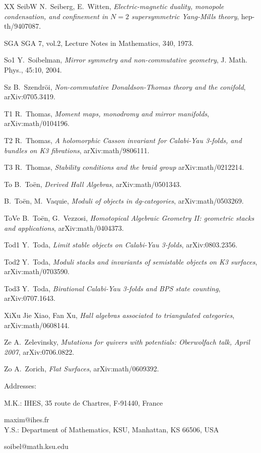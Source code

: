 \documentclass[12pt]{article}
\begin{document}
\begin{thebibliography}{XX}
\bibitem
 {SeibW} N.~Seiberg, E.~Witten, {\it Electric-magnetic duality, monopole condensation, and confinement in $N=2$ supersymmetric Yang-Mills theory}, hep-th/9407087.




\bibitem
 {SGA} SGA 7, vol.2, Lecture Notes in Mathematics, 340, 1973.



\bibitem
 {So1} Y.~Soibelman, {\it  Mirror symmetry and non-commutative geometry}, J. Math. Phys., 45:10, 2004.





\bibitem
 {Sz} B.~Szendr\"oi, {\it Non-commutative Donaldson-Thomas theory and the conifold},
arXiv:0705.3419.


\bibitem
 {T1} R.~Thomas, {\it Moment maps, monodromy and mirror manifolds},
arXiv:math/0104196.


\bibitem
 {T2} R.~Thomas, {\it A holomorphic Casson invariant for Calabi-Yau 3-folds, and bundles on K3 fibrations},
 arXiv:math/9806111.


\bibitem
 {T3} R.~Thomas, {\it  Stability conditions and the braid group}  arXiv:math/0212214.



\bibitem
 {To} B.~To\"en, {\it Derived Hall Algebras}, arXiv:math/0501343.

 B.~To\"en, M.~Vaquie, {\it Moduli of objects in dg-categories}, arXiv:math/0503269.

\bibitem
 {ToVe} B.~To\"en, G.~Vezzosi, {\it Homotopical Algebraic Geometry II: geometric stacks and applications}, arXiv:math/0404373.

\bibitem
 {Tod1} Y.~Toda, {\it Limit stable objects on Calabi-Yau 3-folds}, arXiv:0803.2356.


\bibitem
 {Tod2} Y.~Toda, {\it Moduli stacks and invariants of semistable objects on K3 surfaces}, arXiv:math/0703590.



\bibitem
 {Tod3} Y.~Toda, {\it  Birational Calabi-Yau 3-folds and BPS state counting}, arXiv:0707.1643.


\bibitem
 {XiXu} Jie Xiao, Fan Xu, {\it  Hall algebras associated to triangulated categories},
arXiv:math/0608144.

\bibitem
 {Ze} A.~Zelevinsky, {\it Mutations for quivers with potentials: Oberwolfach talk, April 2007}, arXiv:0706.0822.

\bibitem
 {Zo} A.~Zorich, {\it Flat Surfaces}, arXiv:math/0609392.

\end{thebibliography}


\vspace{5mm}

Addresses:

M.K.: IHES, 35 route de Chartres, F-91440, France

{maxim@ihes.fr}\\



Y.S.: Department of Mathematics, KSU, Manhattan, KS 66506, USA

{soibel@math.ksu.edu}
\end{document}
